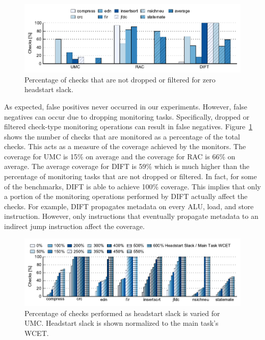 \begin{figure}
  \begin{center}
    \includegraphics{monitoring_hard_drop/data/zero_slack_coverage.pdf}
    \caption{Percentage of checks that are not dropped or filtered for zero
    headstart slack.}
    \label{fig:monitoring_hard_drop.evaluation.zero_slack_coverage}
  \end{center}
\end{figure}

As expected, false positives never occurred in our experiments. However, false
negatives can occur due to dropping monitoring tasks. Specifically, dropped or
filtered check-type monitoring operations can result in false negatives.
Figure~\ref{fig:monitoring_hard_drop.evaluation.zero_slack_coverage} shows the
number of checks that are monitored as a percentage of the total checks. This
acts as a measure of the coverage achieved by the monitors. The coverage for
UMC is 15\% on average and the coverage for RAC is 66\% on average. The average
coverage for DIFT is 59\% which is much higher than the percentage of
monitoring tasks that are not dropped or filtered. In fact, for some of the
benchmarks, DIFT is able to achieve 100\% coverage. This implies that only a
portion of the monitoring operations performed by DIFT actually affect the
checks.  For example, DIFT propagates metadata on every ALU, load, and store
instruction. However, only instructions that eventually propagate metadata to
an indirect jump instruction affect the coverage.

\begin{figure}
  \begin{center}
    \includegraphics{monitoring_hard_drop/data/umc_sweep.pdf}
    \caption{Percentage of checks performed as headstart slack is varied for
    UMC. Headstart slack is shown normalized to the main task's WCET.}
    \label{fig:monitoring_hard_drop.evaluation.umc_sweep}
  \end{center}
\end{figure}

